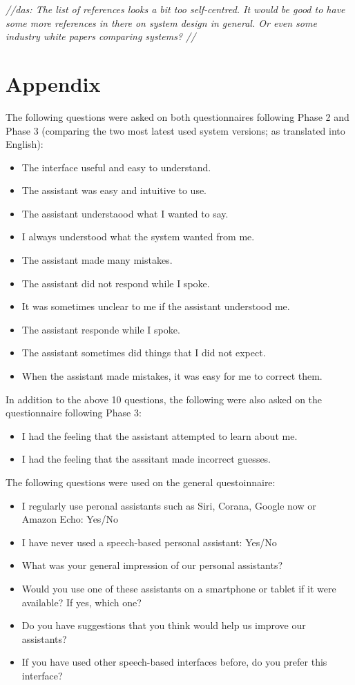 \documentclass[11pt]{article}
\newcommand{\das}[1]{{\color{red}\emph{//das: #1//}}}
\begin{document}
\das{The list of references looks a bit too self-centred. It would be good to have some more references in there on system design in general. Or even some industry white papers comparing systems? }

\section*{Appendix}

\noindent
The following questions were asked on both questionnaires following Phase 2 and Phase 3 (comparing the two most latest used system versions; as translated into English):
\begin{itemize}
 \item The interface useful and easy to understand.
 \item The assistant was easy and intuitive to use.
 \item The assistant understaood what I wanted to say.
 \item I always understood what the system wanted from me. 
 \item The assistant made many mistakes. 
 \item The assistant did not respond while I spoke.
 \item It was sometimes unclear to me if the assistant understood me. 
 \item The assistant responde while I spoke. 
 \item The assistant sometimes did things that I did not expect.
 \item When the assistant made mistakes, it was easy for me to correct them. 
\end{itemize}

\noindent
In addition to the above 10 questions, the following were also asked on the questionnaire following Phase 3:
\begin{itemize}
 \item I had the feeling that the assistant attempted to learn about me.
 \item I had the feeling that the asssitant made incorrect guesses. 
\end{itemize}

\noindent
The following questions were used on the general questoinnaire:
\begin{itemize}
 \item I regularly use peronal assistants such as Siri, Corana, Google now or Amazon Echo: Yes/No
 \item I have never used a speech-based personal assistant: Yes/No
 \item What was your general impression of our personal assistants?
 \item Would you use one of these assistants on a smartphone or tablet if it were available? If yes, which one?
 \item Do you have suggestions that you think would help us improve our assistants?
 \item If you have used other speech-based interfaces before, do you prefer this interface?
\end{itemize}




\end{document}
